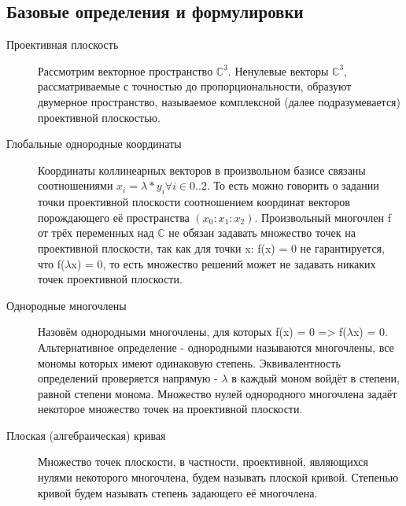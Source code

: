 \documentclass[a4paper, 12pt]{article}
\begin{document}
\subsection{Базовые определения и формулировки}
\begin{description}
\item[Проективная плоскость]
Рассмотрим векторное пространство $\mathbb{C}^3$. Ненулевые векторы $\mathbb{C}^3$, рассматриваемые с точностью до пропорциональности, образуют двумерное пространство, называемое комплексной (далее подразумевается) проективной плоскостью.
\item[Глобальные однородные координаты]
Координаты коллинеарных векторов в произвольном базисе связаны соотношениями $x_i=\lambda*y_i  \forall i \in {0..2}$. То есть можно говорить о задании точки проективной плоскости соотношением координат векторов порождающего её пространства $(x_0:x_1:x_2)$.
Произвольный многочлен f от трёх переменных над $\mathbb{C}$ не обязан задавать множество точек на проективной плоскости, так как для точки x: f(x) = 0 не гарантируется, что f($\lambda$x) = 0, то есть множество решений может не задавать никаких точек проективной плоскости.
\item[Однородные многочлены] Назовём однородными многочлены, для которых f(x) = 0 => f($\lambda$x) = 0. Альтернативное определение - однородными называются многочлены, все мономы которых имеют одинаковую степень. Эквивалентность определений проверяется напрямую - $\lambda$ в каждый моном войдёт в степени, равной степени монома. Множество нулей однородного многочлена задаёт некоторое множество точек на проективной плоскости.
\item[Плоская (алгебраическая) кривая]
Множество точек плоскости, в частности, проективной, являющихся нулями некоторого многочлена, будем называть плоской кривой. Степенью кривой будем называть степень задающего её многочлена.


\end{description}
\end{document}
